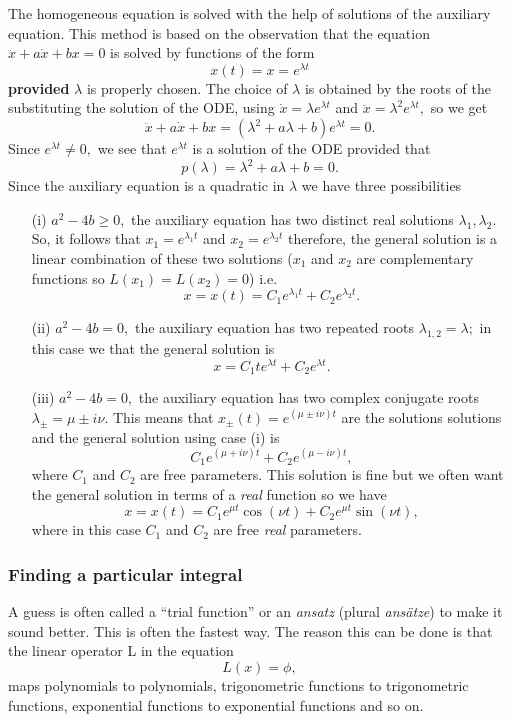 \documentclass[12pt, a4paper]{article}
\theoremstyle{definition}
\theoremstyle{plain}
\begin{document}
The homogeneous equation is solved with the help of solutions of the auxiliary equation. This method is based on the observation that the equation $\ddot{x}+a\dot{x}+bx=0$ is solved by functions of the form $$x(t)=x=e^{\lambda t}$$ \textbf{provided} $\lambda$ is properly chosen. The choice of $\lambda$ is obtained by the roots of the substituting the solution of the ODE, using $\dot{x}=\lambda e^{\lambda t}$ and $\ddot{x}=\lambda^2 e^{\lambda t},$ so we get $$\ddot{x}+a\dot{x}+bx=(\lambda^2+a\lambda+b)e^{\lambda t}=0.$$ Since $e^{\lambda t} \neq 0,$ we see that $e^{\lambda t}$ is a solution of the ODE provided that $$p(\lambda)=\lambda^2+a\lambda+b=0.$$ Since the auxiliary equation is a quadratic in $\lambda$ we have three possibilities \begin{enumerate}
	
	\item[(i)] $a^2-4b \geq 0,$ the auxiliary equation has two distinct real solutions $\lambda_1,\lambda_2.$ So, it follows that $x_1=e^{\lambda_1t}$ and $x_2=e^{\lambda_2t}$ therefore, the general solution is a linear combination of these two solutions ($x_1$ and $x_2$ are complementary functions so $L(x_1)=L(x_2)=0$) i.e. $$x=x(t)=C_1e^{\lambda_1t}+C_2e^{\lambda_2t}.$$

	\item[(ii)] $a^2-4b=0,$ the auxiliary equation has two repeated roots $\lambda_{1,2} =\lambda;$ in this case we that the general solution is $$x=C_1te^{\lambda t}+C_2e^{\lambda t}.$$

	\item[(iii)] $a^2-4b=0,$ the auxiliary equation has two complex conjugate roots $\lambda_{\pm}=\mu \pm i\nu.$ This means that $x_{\pm}(t)=e^{(\mu \pm i\nu)t}$ are the solutions solutions and the general solution using case (i) is $$C_1e^{(\mu + i\nu)t}+C_2e^{(\mu - i\nu)t},$$ where $C_1$ and $C_2$ are free parameters. This solution is fine but we often want the general solution in terms of a \textit{real} function so we have $$x=x(t)=C_1e^{\mu t}\cos{(\nu t)}+C_2e^{\mu t}\sin{(\nu t)},$$ where in this case $C_1$ and $C_2$ are free \textit{real} parameters. 

\end{enumerate}

\subsubsection*{Finding a particular integral}

A guess is often called a “trial function” or an \textit{ansatz} (plural \textit{ansätze}) to make it sound better. This is often the fastest way. The reason this can be done is that the linear operator L in the equation $$L(x)=\phi,$$ maps polynomials to polynomials, trigonometric functions to trigonometric functions, exponential functions to exponential functions and so on.
\end{document}
